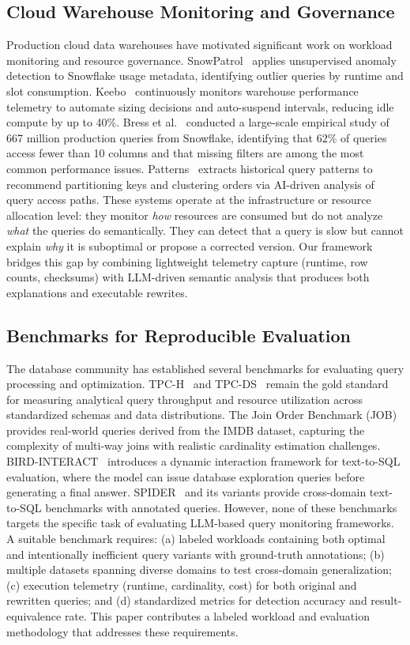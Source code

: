 \documentclass[conference]{IEEEtran}
\begin{document}
\subsection{Cloud Warehouse Monitoring and Governance}
Production cloud data warehouses have motivated significant work on workload monitoring and resource governance. SnowPatrol~\cite{snowpatrol2023} applies unsupervised anomaly detection to Snowflake usage metadata, identifying outlier queries by runtime and slot consumption. Keebo~\cite{keebo2023} continuously monitors warehouse performance telemetry to automate sizing decisions and auto-suspend intervals, reducing idle compute by up to 40\%. Bress et al.~\cite{bress2025snowflake} conducted a large-scale empirical study of 667 million production queries from Snowflake, identifying that 62\% of queries access fewer than 10 columns and that missing filters are among the most common performance issues. Patterns~\cite{patterns2026} extracts historical query patterns to recommend partitioning keys and clustering orders via AI-driven analysis of query access paths. These systems operate at the infrastructure or resource allocation level: they monitor \textit{how} resources are consumed but do not analyze \textit{what} the queries do semantically. They can detect that a query is slow but cannot explain \textit{why} it is suboptimal or propose a corrected version. Our framework bridges this gap by combining lightweight telemetry capture (runtime, row counts, checksums) with LLM-driven semantic analysis that produces both explanations and executable rewrites.

\subsection{Benchmarks for Reproducible Evaluation}
The database community has established several benchmarks for evaluating query processing and optimization. TPC-H~\cite{tpch} and TPC-DS~\cite{tpcds} remain the gold standard for measuring analytical query throughput and resource utilization across standardized schemas and data distributions. The Join Order Benchmark (JOB)~\cite{leis2015job} provides real-world queries derived from the IMDB dataset, capturing the complexity of multi-way joins with realistic cardinality estimation challenges. BIRD-INTERACT~\cite{huo2025bird} introduces a dynamic interaction framework for text-to-SQL evaluation, where the model can issue database exploration queries before generating a final answer. SPIDER~\cite{yu2018spider} and its variants provide cross-domain text-to-SQL benchmarks with annotated queries. However, none of these benchmarks targets the specific task of evaluating LLM-based query monitoring frameworks. A suitable benchmark requires: (a) labeled workloads containing both optimal and intentionally inefficient query variants with ground-truth annotations; (b) multiple datasets spanning diverse domains to test cross-domain generalization; (c) execution telemetry (runtime, cardinality, cost) for both original and rewritten queries; and (d) standardized metrics for detection accuracy and result-equivalence rate. This paper contributes a labeled workload and evaluation methodology that addresses these requirements.
\end{document}
